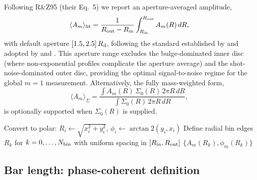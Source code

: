 \documentclass[fleqn,usenatbib]{mnras}
\newcommand{\Am}[1]{A_{#1}}
\newcommand{\Rd}{R_{\rm d}}
\begin{document}
Following R\&Z95 (their Eq.~5) we report an aperture-averaged
amplitude,
\begin{equation}
  \langle \Am{m} \rangle_{\rm lit} = \frac{1}{R_{\rm out} - R_{\rm in}}
      \int_{R_{\rm in}}^{R_{\rm out}} \Am{m}(R)\,dR,
  \label{eq:literature_average}
\end{equation}
with default aperture $[1.5, 2.5]\,\Rd$, following the standard
established by \citet{1995ApJ...447...82R} and adopted by \citet{1997ApJ...477..118Z}
and \citet{2013ApJ...772..135Z}.  This aperture range excludes the
bulge-dominated inner disc (where non-exponential profiles
complicate the aperture average) and the shot-noise-dominated
outer disc, providing the optimal signal-to-noise regime for the
global $m=1$ measurement.  Alternatively, the fully
mass-weighted \citet{2002A&A...391..471J} form,
\begin{equation}
  \langle \Am{m} \rangle_{\Sigma} =
     \frac{\int \Am{m}(R)\,\Sigma_0(R)\,2\pi R\,dR}
          {\int \Sigma_0(R)\,2\pi R\,dR},
  \label{eq:jog_integral}
\end{equation}
is optionally supported when $\Sigma_0(R)$ is supplied.


\begin{algorithm}[t]
  \caption{Particle-based Fourier decomposition (\textsc{compute\_fourier})}
  \label{alg:fourier}
  \DontPrintSemicolon
  \BlankLine
  Convert to polar: $R_i \leftarrow \sqrt{x_i^2 + y_i^2}$,
                   $\phi_i \leftarrow \arctan2(y_i, x_i)$\;
  Define radial bin edges $R_k$ for $k = 0, \dots, N_{\rm bin}$
        with uniform spacing in $[R_{\rm in}, R_{\rm out}]$\;
    \Return $\{A_m(R_k), \phi_m(R_k)\}$
\end{algorithm}

\subsection{Bar length: phase-coherent definition}
\label{sec:bar_length}
\end{document}
